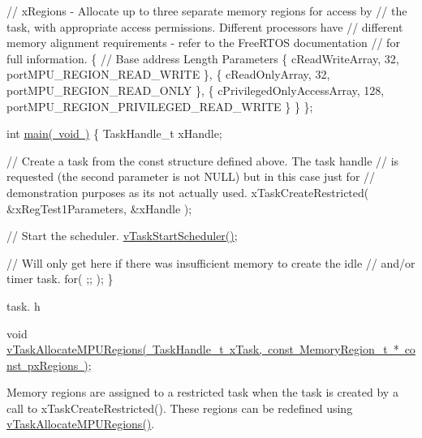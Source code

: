 \begin{DoxyPre}    // xRegions - Allocate up to three separate memory regions for access by
    // the task, with appropriate access permissions.  Different processors have
    // different memory alignment requirements - refer to the FreeRTOS documentation
    // for full information.
    \{
        // Base address                 Length  Parameters
        \{ cReadWriteArray,              32,     portMPU\_REGION\_READ\_WRITE \},
        \{ cReadOnlyArray,               32,     portMPU\_REGION\_READ\_ONLY \},
        \{ cPrivilegedOnlyAccessArray,   128,    portMPU\_REGION\_PRIVILEGED\_READ\_WRITE \}
    \}
\};\end{DoxyPre}



\begin{DoxyPre}int \mbox{\hyperlink{mian_8c_a840291bc02cba5474a4cb46a9b9566fe}{main( void )}}
\{
TaskHandle\_t xHandle;\end{DoxyPre}



\begin{DoxyPre}    // Create a task from the const structure defined above.  The task handle
    // is requested (the second parameter is not NULL) but in this case just for
    // demonstration purposes as its not actually used.
    xTaskCreateRestricted( \&xRegTest1Parameters, \&xHandle );\end{DoxyPre}



\begin{DoxyPre}    // Start the scheduler.
    \mbox{\hyperlink{task_8h_aaf9dca1065c60abdeb309d56ab7293cb}{vTaskStartScheduler()}};\end{DoxyPre}



\begin{DoxyPre}    // Will only get here if there was insufficient memory to create the idle
    // and/or timer task.
    for( ;; );
\}
   \end{DoxyPre}


task. h 
\begin{DoxyPre}
 void \mbox{\hyperlink{task_8h_ad889595baff9faf9efe02f3696825409}{vTaskAllocateMPURegions( TaskHandle\_t xTask, const MemoryRegion\_t * const pxRegions )}};\end{DoxyPre}


Memory regions are assigned to a restricted task when the task is created by a call to x\+Task\+Create\+Restricted(). These regions can be redefined using \mbox{\hyperlink{task_8h_ad889595baff9faf9efe02f3696825409}{v\+Task\+Allocate\+M\+P\+U\+Regions()}}.


